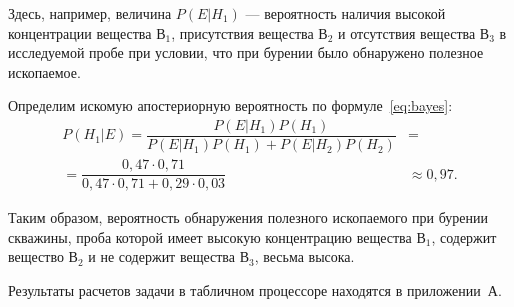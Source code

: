 Здесь, например, величина \( P(E | H_1) \) --- вероятность наличия
высокой концентрации вещества \( \text{В}_1 \),
присутствия вещества \( \text{В}_2 \) и
отсутствия вещества \( \text{В}_3 \)
в исследуемой пробе при условии,
что при бурении было обнаружено полезное ископаемое.

Определим искомую апостериорную вероятность по формуле~\eqref{eq:bayes}:
\begin{align*}
  P(H_1 | E) =
  \dfrac{P(E | H_1) P(H_1)}{P(E | H_1) P(H_1) + P(E | H_2) P(H_2)} &= \\
  = \dfrac{0{,}47 \cdot 0{,}71}{0{,}47 \cdot 0{,}71 + 0{,}29 \cdot 0{,}03} &\approx 0{,}97.
\end{align*}

Таким образом, вероятность обнаружения полезного ископаемого при бурении скважины,
проба которой имеет высокую концентрацию вещества \( \text{В}_1 \),
содержит вещество \( \text{В}_2 \) и
не содержит вещества \( \text{В}_3 \), весьма высока.

Результаты расчетов задачи в табличном процессоре находятся в приложении~А.

\newpage